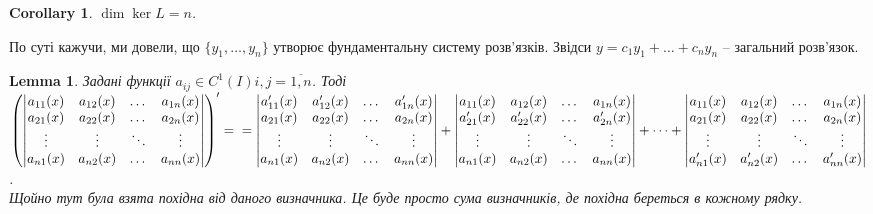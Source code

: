 \documentclass[a4paper, 10pt]{article}
\theoremstyle{theoremdd}
\theoremstyle{theoremdd}
\theoremstyle{theoremdd}
\theoremstyle{theoremdd}
\theoremstyle{theoremdd}
\theoremstyle{theoremdd}
\theoremstyle{theoremdd}
\newtheorem{lemma}[theorem]{Lemma}
\theoremstyle{theoremdd}
\newtheorem{corollary}[theorem]{Corollary}
\begin{document}
\begin{corollary}
 $\dim \ker L = n$.
 \end{corollary}
 
По суті кажучи, ми довели, що $\{y_1,\dots,y_n\}$ утворює фундаментальну систему розв'язків. Звідси $y = c_1 y_1 + \dots + c_n y_n$ -- загальний розв'язок.

\begin{lemma}
Задані функції $a_{ij} \in C^1(I) i,j = \overline{1,n}$. Тоді\\
$\displaystyle \left(
\begin{vmatrix} 
	a_{11}(x) &  a_{12}(x) & \dots & a_{1n}(x) \\ 
	a_{21}(x) &  a_{22}(x) & \dots & a_{2n}(x) \\ 
	\vdots &  \vdots & \ddots & \vdots \\
	a_{n1}(x) &  a_{n2}(x) & \dots & a_{nn}(x) \\ 
\end{vmatrix}
\right)' = \\ =
\begin{vmatrix} 
	a'_{11}(x) &  a'_{12}(x) & \dots & a'_{1n}(x) \\ 
	a_{21}(x) &  a_{22}(x) & \dots & a_{2n}(x) \\ 
	\vdots &  \vdots & \ddots & \vdots \\
	a_{n1}(x) &  a_{n2}(x) & \dots & a_{nn}(x) \\ 
\end{vmatrix}
+
\begin{vmatrix} 
	a_{11}(x) &  a_{12}(x) & \dots & a_{1n}(x) \\ 
	a'_{21}(x) &  a'_{22}(x) & \dots & a'_{2n}(x) \\ 
	\vdots &  \vdots & \ddots & \vdots \\
	a_{n1}(x) &  a_{n2}(x) & \dots & a_{nn}(x) \\ 
\end{vmatrix}
+ \dots +
\begin{vmatrix} 
	a_{11}(x) &  a_{12}(x) & \dots & a_{1n}(x) \\ 
	a_{21}(x) &  a_{22}(x) & \dots & a_{2n}(x) \\ 
	\vdots &  \vdots & \ddots & \vdots \\
	a'_{n1}(x) &  a'_{n2}(x) & \dots & a'_{nn}(x) \\ 
\end{vmatrix}
$.\\
Щойно тут була взята похідна від даного визначника. Це буде просто сума визначників, де похідна береться в кожному рядку.
\end{lemma}
\end{document}
